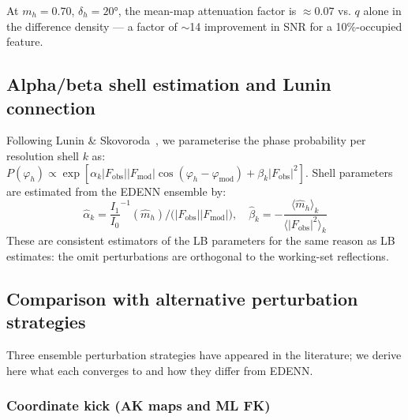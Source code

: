 \documentclass[10pt,twocolumn]{article}
\newcommand{\Fobs}{F_{\!\mathrm{obs}}}
\newcommand{\Fmod}{F_{\!\mathrm{mod}}}
\newcommand{\phimod}{\varphi_{\mathrm{mod}}}
\newcommand{\phih}{\varphi_h}
\newcommand{\mh}{m_h}
\begin{document}
\noindent At $\mh=0.70$, $\delta_h=20°$, the mean-map attenuation
factor is $\approx 0.07$ vs. $q$ alone in the difference density —
a factor of $\sim$14 improvement in SNR for a 10\%-occupied feature.

\subsection{Alpha/beta shell estimation and Lunin connection}

Following Lunin \& Skovoroda~\cite{lunin1995}, we parameterise
the phase probability per resolution shell $k$ as:
$P(\phih) \propto \exp[\alpha_k|\Fobs||\Fmod|\cos(\phih-\phimod)
+ \beta_k|\Fobs|^2]$.
Shell parameters are estimated from the EDENN ensemble by:
\begin{equation}
  \hat\alpha_k = \frac{I_1}{I_0}^{-1}(\hat m_h)\Big/
    \bigl(|\Fobs||\Fmod|\bigr),\quad
  \hat\beta_k = -\frac{\langle \hat m_h\rangle_k}
    {\langle|\Fobs|^2\rangle_k}
  \label{eq:alpha_beta}
\end{equation}
These are consistent estimators of the LB parameters for the
same reason as LB estimates: the omit perturbations are
orthogonal to the working-set reflections.

\subsection{Comparison with alternative perturbation strategies}

Three ensemble perturbation strategies have appeared in the literature;
we derive here what each converges to and how they differ from EDENN.

\subsubsection{Coordinate kick (AK maps and ML FK)}
\end{document}
